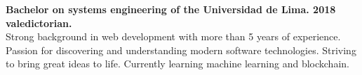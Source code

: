 

\begin{cvparagraph}

{\bfseries Bachelor on systems engineering of the Universidad de Lima. 2018 valedictorian.}\\
Strong background in web development with more than 5 years of experience. Passion for discovering and understanding modern software technologies. Striving to bring great ideas to life. Currently learning machine learning and blockchain.
\end{cvparagraph}
